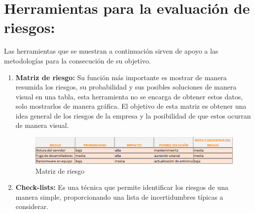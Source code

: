 \section{Herramientas  para la evaluación de riesgos:}
Las herramientas que se muestran a continuación sirven de apoyo a las metodologías para la consecución de su objetivo.
\begin{enumerate}

\item {\bfseries Matriz de riesgo:}
Su función más importante es mostrar de manera resumida los riesgos, su probabilidad  y sus posibles soluciones de manera visual en una tabla, esta herramienta no se encarga de obtener estos datos, solo mostrarlos de manera gráfica. El objetivo de esta matriz es obtener una idea general de los riesgos de la empresa y la posibilidad de que estos ocurran de manera visual.\\
\begin{figure}[tphb]
  		   \centering
     		   \includegraphics[width=7in]{matriz_de_riesgo.png}
  		   \caption{Matriz de riesgo}
  		   \label{img:matriz_riesgo}
\end{figure}

\item {\bfseries Check-lists:}
Es una técnica que permite identificar los riesgos de una manera simple, proporcionando una lista de incertidumbres típicas a considerar.


\end{enumerate}
